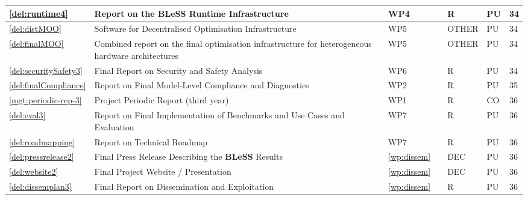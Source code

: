 \documentclass[a4paper,11pt]{article}
\newcommand{\project}[1]{\textbf{#1}\xspace}
\newcommand{\BLESS}{\project{BLeSS}}
\newcommand{\TheProject}{\BLESS}
\begin{document}
\begin{minipage}{\textwidth}
\begin{center}
\begin{tabular}{|p{0.8cm}|p{9.25cm}|p{0.8cm}|p{1.15cm}|p{1.6cm}|p{0.8cm}|p{0.8cm}|}
\hline \ref{del:runtime4} & Report on the \TheProject{} Runtime Infrastructure & WP4 & \CODEPLAYshort{} & R & PU & 34 \\
 \hline  \ref{del:distMOO} & Software for Decentralised Optimisation Infrastructure & WP5 & \SCCHshort{} & OTHER & PU & 34 \\
\hline \ref{del:finalMOO} & Combined report on the final optimisation infrastructure for heterogeneous hardware architectures & WP5 & \SCCHshort{} & OTHER & PU & 34 \\
\hline \ref{del:securitySafety3} & Final Report on Security and Safety Analysis & WP6 & \IBMshort{} & R & PU & 34 \\
\hline \ref{del:finalCompliance} & Report on Final Model-Level Compliance and Diagnostics & WP2 & \PRLshort{} & R & PU & 35 \\
\hline \ref{mgt:periodic-rep-3} & Project Periodic Report (third year) & WP1 & \coordshort{} & R & CO & 36 \\
\hline \ref{del:eval3} & Report on Final Implementation of Benchmarks and Use Cases and Evaluation & WP7 & \GOLEMshort{} & R & PU & 36 \\
\hline \ref{del:roadmapping} & Report on Technical Roadmap & WP7 & \SAshort{} & R & PU & 36 \\	
\hline \ref{del:pressrelease2} & Final Press Release Describing the \TheProject{} Results & \ref{wp:dissem} & \SAshort{} & DEC & PU & 36 \\
\hline \ref{del:website2} & Final Project Website / Presentation & \ref{wp:dissem} & \SAshort{} & DEC & PU & 36 \\
\hline \ref{del:dissemplan3} & Final Report on Dissemination and Exploitation & \ref{wp:dissem} & \SAshort{} & R & PU &  36 \\

\hline
\end{tabular}
\end{center}
\end{minipage}





\bigskip\bigskip\bigskip
\pagebreak
{}
\end{document}
